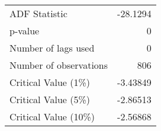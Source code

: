 \begin{tabular}{lr}
\toprule
 ADF Statistic          & -28.1294  \\
 p-value                &   0       \\
 Number of lags used    &   0       \\
 Number of observations & 806       \\
 Critical Value (1\%)    &  -3.43849 \\
 Critical Value (5\%)    &  -2.86513 \\
 Critical Value (10\%)   &  -2.56868 \\
\bottomrule
\end{tabular}